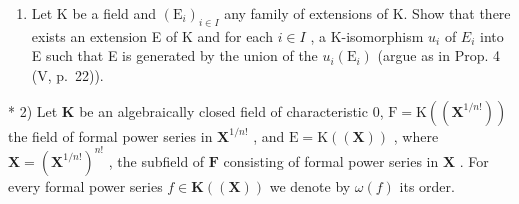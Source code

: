 \begin{enumerate}
\def\labelenumi{\arabic{enumi})}
\tightlist
\item
  Let K be a field and \((\mathrm{E}_{i})_{i\in I}\) any family of extensions of K. Show that there exists an extension E of K and for each \(i\in I\) , a K-isomorphism \(u_{i}\) of \(E_{i}\) into E such that E is generated by the union of the \(u_{i}(\mathrm{E}_{i})\) (argue as in Prop. 4 (V, p.~22)).
\end{enumerate}

* 2) Let \(\mathbf{K}\) be an algebraically closed field of characteristic 0, \(\mathrm{F} = \mathrm{K}((\mathbf{X}^{1 / n!}))\) the field of formal power series in \(\mathbf{X}^{1 / n!}\) , and \(\mathrm{E} = \mathrm{K}((\mathbf{X}))\) , where \(\mathbf{X} = (\mathbf{X}^{1 / n!})^{n!}\) , the subfield of \(\mathbf{F}\) consisting of formal power series in \(\mathbf{X}\) . For every formal power series \(f \in \mathbf{K}((\mathbf{X}))\) we denote by \(\omega(f)\) its order.

